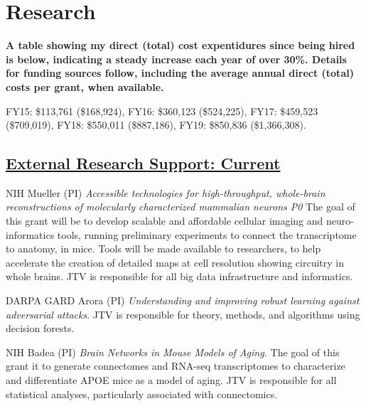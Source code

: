 \documentclass[10pt,colorlinks=true,urlcolor=blue]{moderncv}
\begin{document}
\section{Research}
\textbf{A table showing my direct (total) cost expentidures since being hired is below, indicating a steady increase each year of over 30\%. Details for funding sources follow, including the average annual direct (total) costs per grant, when available.
}
\begin{flushleft}
FY15:	\$113,761 (\$168,924), 
\linebreak FY16:	\$360,123 (\$524,225),
\linebreak FY17:	\$459,523 (\$709,019),
\linebreak FY18:	\$550,011 (\$887,186),
\linebreak FY19:	\$850,836 (\$1,366,308).
\end{flushleft}

\subsection{\href{https://neurodata.io/about/funding/}{External Research Support: Current}}
    {NIH}%
    {}
    {Mueller (PI)}
    {\emph{Accessible technologies for high-throughput, whole-brain reconstructions of molecularly characterized mammalian neurons  P0} 
    The  goal of this grant will be to develop scalable
    and affordable cellular imaging and neuro-informatics tools,
    running preliminary experiments to connect the transcriptome to
    anatomy, in mice. Tools will be made available to researchers,
    to help accelerate the creation of detailed maps at cell
    resolution showing circuitry in whole brains.}
    {JTV is responsible for all big data infrastructure and informatics.}
    {}
    
    {DARPA GARD}%
    {}
    {Arora (PI)}
    {\emph{Understanding and improving robust learning against adversarial attacks}.}
    {JTV is responsible for theory, methods, and algorithms using decision forests.}
    {}

    {NIH}%
    {}
    {Badea (PI)}
    {\emph{Brain Networks in Mouse Models of Aging.} 
    The  goal of this grant it to generate connectomes and RNA-seq transcriptomes to characterize and differentiate APOE mice as a model of aging.}
    {JTV is responsible for all statistical analyses, particularly associated with connectomics.}
    {}
\end{document}
